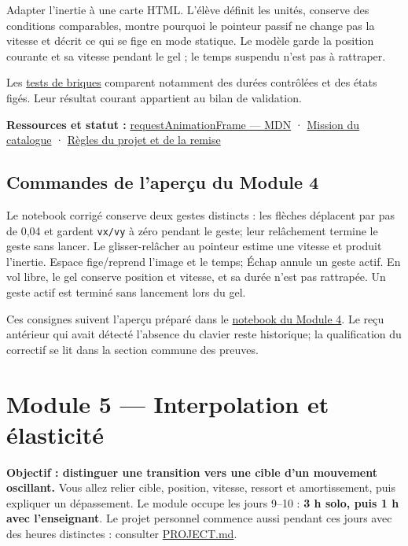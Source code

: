 \documentclass[
  canadien,
  11pt,
  a4paper,
]{report}
\begin{document}
Adapter l'inertie à une carte HTML. L'élève définit les unités, conserve
des conditions comparables, montre pourquoi le pointeur passif ne change
pas la vitesse et décrit ce qui se fige en mode statique. Le modèle
garde la position courante et sa vitesse pendant le gel ; le temps
suspendu n'est pas à rattraper.

Les \href{../../../../../tests/learning-notebooks-bricks.test.ts}{tests
de briques} comparent notamment des durées contrôlées et des états
figés. Leur résultat courant appartient au bilan de validation.

\textbf{Ressources et statut :}
\href{https://developer.mozilla.org/en-US/docs/Web/API/Window/requestAnimationFrame}{requestAnimationFrame
--- MDN} ·
\href{../../../../../packages/learning/src/catalog.ts}{Mission du
catalogue} · \href{../../PROJECT.md}{Règles du projet et de la remise}

\section{Commandes de l'aperçu du Module
4}\label{commandes-de-laperuxe7u-du-module-4}

Le notebook corrigé conserve deux gestes distincts : les flèches
déplacent par pas de 0,04 et gardent \texttt{vx/\allowbreak{}vy} à zéro pendant le
geste; leur relâchement termine le geste sans lancer. Le
glisser-relâcher au pointeur estime une vitesse et produit l'inertie.
Espace fige/reprend l'image et le temps; Échap annule un geste actif. En
vol libre, le gel conserve position et vitesse, et sa durée n'est pas
rattrapée. Un geste actif est terminé sans lancement lors du gel.

Ces consignes suivent l'aperçu préparé dans le
\href{../../notebooks/module-4.ipynb}{notebook du Module 4}. Le reçu
antérieur qui avait détecté l'absence du clavier reste historique; la
qualification du correctif se lit dans la section commune des preuves.

\chapter{Module 5 --- Interpolation et
élasticité}\label{module-5-interpolation-et-uxe9lasticituxe9}

\textbf{Objectif : distinguer une transition vers une cible d'un
mouvement oscillant.} Vous allez relier cible, position, vitesse,
ressort et amortissement, puis expliquer un dépassement. Le module
occupe les jours 9--10 : \textbf{3 h solo, puis 1 h avec l'enseignant}.
Le projet personnel commence aussi pendant ces jours avec des heures
distinctes : consulter \href{../../PROJECT.md}{PROJECT.md}.
\end{document}
